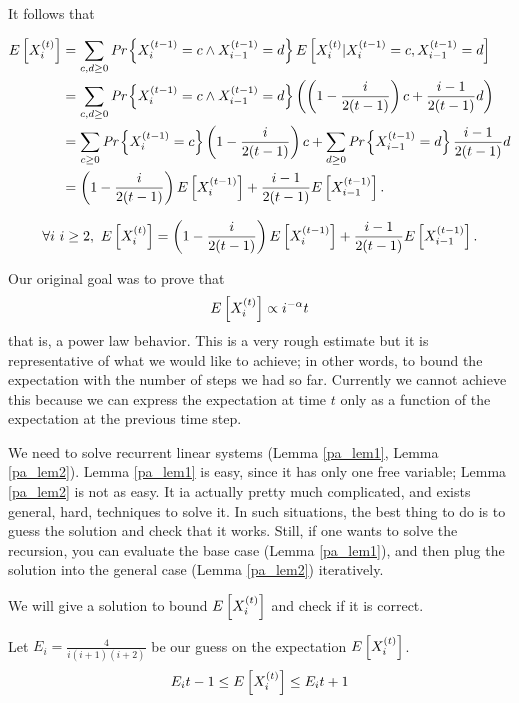 It follows that

\begin{align*}
E\left[X_i^{(t)}\right] &= \sum_{c,d \geq 0}\emph{Pr}\left\{X_i^{(t-1)} = c \wedge X_{i-1}^{(t-1)} = d\right\}E\left[X_i^{(t)} | X_i^{(t-1)} = c,  X_{i-1}^{(t-1)} = d\right]\\
&= \sum_{c,d \geq 0}\emph{Pr}\left\{X_i^{(t-1)} = c \wedge X_{i-1}^{(t-1)} = d\right\}\left(\left(1-\frac{i}{2(t-1)}\right)c + \frac{i -1}{2(t-1)}d\right)\\
& = \sum_{c \geq 0}\emph{Pr}\left\{X_i^{(t-1)} = c\right\}\left(1-\frac{i}{2(t-1)}\right)c + \sum_{d \geq 0}\emph{Pr}\left\{X_{i-1}^{(t-1)} = d\right\}\frac{i -1}{2(t-1)}d\\
&=\left(1-\frac{i}{2(t-1)}\right)E\left[X_i^{(t-1)}\right] +\frac{i -1}{2(t-1)}E\left[X_{i-1}^{(t-1)}\right] .
\end{align*}

\begin{lem}\label{pa_lem2}
	\begin{equation}
	\forall i\ i \geq 2,\ E\left[X_i^{(t)}\right] = \left(1-\frac{i}{2(t-1)}\right)E\left[X_i^{(t-1)}\right] +\frac{i -1}{2(t-1)}E\left[X_{i-1}^{(t-1)}\right].
	\end{equation}
\end{lem}

Our original goal was to prove that
\begin{equation}
E\left[X_i^{(t)}\right] \propto i^{-\alpha}t
\end{equation}
that is, a power law behavior. This is a very rough estimate but it is representative of what we would like to achieve; in other words, to bound the expectation with the number of steps we had so far. Currently we cannot achieve this because we can express the expectation at time $t$ only as a function of the expectation at the previous time step. 

We need to solve recurrent linear systems (Lemma \ref{pa_lem1}, Lemma \ref{pa_lem2}). Lemma \ref{pa_lem1} is easy, since it has only one free variable; Lemma \ref{pa_lem2} is not as easy. It ia actually pretty much complicated, and exists general, hard, techniques to solve it. In such situations, the best thing to do is to guess the solution and check that it works. Still, if one wants to solve the recursion, you can evaluate the base case (Lemma \ref{pa_lem1}), and then plug the solution into the general case (Lemma \ref{pa_lem2}) iteratively.

We will give a solution to bound $E\left[X_i^{(t)}\right]$ and check if it is correct.

\begin{thm}\label{pa_thm}
	Let $E_i = \frac{4}{i(i+1)(i+2)}$ be our guess on the expectation $E\left[X_i^{(t)}\right]$. 
	\begin{equation}\label{pa_eq}
		E_it - 1 \leq E\left[X_i^{(t)}\right] \leq E_it + 1
	\end{equation}
\end{thm}

